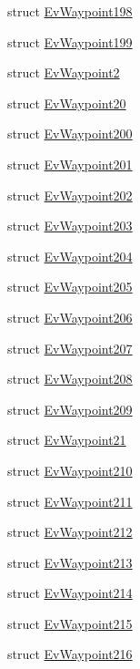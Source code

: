 \begin{DoxyCompactItemize}
struct \hyperlink{structcl__move__base__z_1_1EvWaypoint198}{Ev\+Waypoint198}
\item 
struct \hyperlink{structcl__move__base__z_1_1EvWaypoint199}{Ev\+Waypoint199}
\item 
struct \hyperlink{structcl__move__base__z_1_1EvWaypoint2}{Ev\+Waypoint2}
\item 
struct \hyperlink{structcl__move__base__z_1_1EvWaypoint20}{Ev\+Waypoint20}
\item 
struct \hyperlink{structcl__move__base__z_1_1EvWaypoint200}{Ev\+Waypoint200}
\item 
struct \hyperlink{structcl__move__base__z_1_1EvWaypoint201}{Ev\+Waypoint201}
\item 
struct \hyperlink{structcl__move__base__z_1_1EvWaypoint202}{Ev\+Waypoint202}
\item 
struct \hyperlink{structcl__move__base__z_1_1EvWaypoint203}{Ev\+Waypoint203}
\item 
struct \hyperlink{structcl__move__base__z_1_1EvWaypoint204}{Ev\+Waypoint204}
\item 
struct \hyperlink{structcl__move__base__z_1_1EvWaypoint205}{Ev\+Waypoint205}
\item 
struct \hyperlink{structcl__move__base__z_1_1EvWaypoint206}{Ev\+Waypoint206}
\item 
struct \hyperlink{structcl__move__base__z_1_1EvWaypoint207}{Ev\+Waypoint207}
\item 
struct \hyperlink{structcl__move__base__z_1_1EvWaypoint208}{Ev\+Waypoint208}
\item 
struct \hyperlink{structcl__move__base__z_1_1EvWaypoint209}{Ev\+Waypoint209}
\item 
struct \hyperlink{structcl__move__base__z_1_1EvWaypoint21}{Ev\+Waypoint21}
\item 
struct \hyperlink{structcl__move__base__z_1_1EvWaypoint210}{Ev\+Waypoint210}
\item 
struct \hyperlink{structcl__move__base__z_1_1EvWaypoint211}{Ev\+Waypoint211}
\item 
struct \hyperlink{structcl__move__base__z_1_1EvWaypoint212}{Ev\+Waypoint212}
\item 
struct \hyperlink{structcl__move__base__z_1_1EvWaypoint213}{Ev\+Waypoint213}
\item 
struct \hyperlink{structcl__move__base__z_1_1EvWaypoint214}{Ev\+Waypoint214}
\item 
struct \hyperlink{structcl__move__base__z_1_1EvWaypoint215}{Ev\+Waypoint215}
\item 
struct \hyperlink{structcl__move__base__z_1_1EvWaypoint216}{Ev\+Waypoint216}

\end{DoxyCompactItemize}
